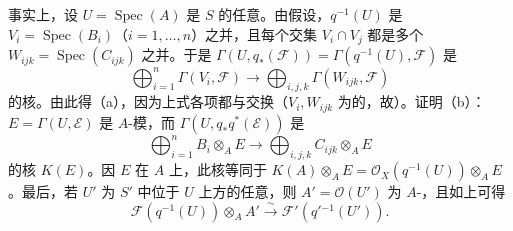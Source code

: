 事实上，设 $U=\operatorname{Spec}(A)$ 是 $S$ 的任意。由假设，$q^{-1}(U)$ 是 $V_i=\operatorname{Spec}(B_i)$（$i=1,\ldots,n$）之并，且每个交集 $V_i\cap V_j$ 都是多个 $W_{ijk}=\operatorname{Spec}(C_{ijk})$ 之并。于是 $\Gamma(U,q_*(\mathcal F))=\Gamma(q^{-1}(U),\mathcal F)$ 是
\[
\bigoplus_{i=1}^n\Gamma(V_i,\mathcal F)\longrightarrow\bigoplus_{i,j,k}\Gamma(W_{ijk},\mathcal F)
\]
的核。由此得（a），因为上式各项都与交换（$V_i,W_{ijk}$ 为的，故）。证明（b）：$E=\Gamma(U,\mathcal E)$ 是 $A$-模，而 $\Gamma(U,q_*q^*(\mathcal E))$ 是
\[
\bigoplus_{i=1}^n B_i\otimes_A E\longrightarrow\bigoplus_{i,j,k}C_{ijk}\otimes_A E
\]
的核 $K(E)$。因 $E$ 在 $A$ 上，此核等同于 $K(A)\otimes_A E=\mathcal O_X(q^{-1}(U))\otimes_A E$。最后，若 $U'$ 为 $S'$ 中位于 $U$ 上方的任意，则 $A'=\mathcal O(U')$ 为 $A$-，且如上可得
\[
\mathcal F(q^{-1}(U))\otimes_A A'\xrightarrow{\sim}\mathcal F'(q'{}^{-1}(U')).
\]

